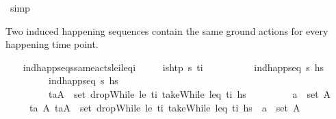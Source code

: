 \begin{isabellebody}
\ simp\isanewline
\ \ \isamarkupfalse%
%
\endisatagproof
{\isafoldproof}%
%
\isadelimproof
%
\endisadelimproof
%
\begin{isamarkuptext}%
Two induced happening sequences contain the same ground actions for 
  every happening time point.%
\end{isamarkuptext}\isamarkuptrue%
\ \ \isamarkupfalse%
\ ind{\isacharunderscore}{\kern0pt}happ{\isacharunderscore}{\kern0pt}seqs{\isacharunderscore}{\kern0pt}same{\isacharunderscore}{\kern0pt}acts{\isacharunderscore}{\kern0pt}le\isactrlsub i{\isacharunderscore}{\kern0pt}leq\isactrlsub i{\isacharcolon}{\kern0pt}\isanewline
\ \ \ \ \ {\isachardoublequoteopen}is{\isacharunderscore}{\kern0pt}htp\ {\isasympi}s\ t\isactrlsub i{\isachardoublequoteclose}\ \isanewline
\ \ \ \ \ \ \ \ \ {\isachardoublequoteopen}ind{\isacharunderscore}{\kern0pt}happ{\isacharunderscore}{\kern0pt}seq\ {\isasympi}s\ hs\ \isanewline
\ \ \ \ \ \ \ \ \ {\isachardoublequoteopen}ind{\isacharunderscore}{\kern0pt}happ{\isacharunderscore}{\kern0pt}seq\ {\isasympi}s\ hs\isanewline
\ \ \ \ \ \ \ \ \ {\isachardoublequoteopen}{\isacharparenleft}{\kern0pt}t\isactrlsub a{\isacharcomma}{\kern0pt}A{\isacharparenright}{\kern0pt}\ {\isasymin}\ set\ {\isacharparenleft}{\kern0pt}dropWhile\ {\isacharparenleft}{\kern0pt}le\ t\isactrlsub i{\isacharparenright}{\kern0pt}\ {\isacharparenleft}{\kern0pt}takeWhile\ {\isacharparenleft}{\kern0pt}leq\ t\isactrlsub i{\isacharparenright}{\kern0pt}\ hs\isanewline
\ \ \ \ \ \ \ \ \ {\isachardoublequoteopen}a\ {\isasymin}\ set\ A{\isachardoublequoteclose}\isanewline
\ \ \ \ \ {\isachardoublequoteopen}{\isasymexists}t\isactrlsub a{\isacharprime}{\kern0pt}\ A{\isacharprime}{\kern0pt}{\isachardot}{\kern0pt}\ {\isacharparenleft}{\kern0pt}t\isactrlsub a{\isacharprime}{\kern0pt}{\isacharcomma}{\kern0pt}A{\isacharprime}{\kern0pt}{\isacharparenright}{\kern0pt}\ {\isasymin}\ set\ {\isacharparenleft}{\kern0pt}dropWhile\ {\isacharparenleft}{\kern0pt}le\ t\isactrlsub i{\isacharparenright}{\kern0pt}\ {\isacharparenleft}{\kern0pt}takeWhile\ {\isacharparenleft}{\kern0pt}leq\ t\isactrlsub i{\isacharparenright}{\kern0pt}\ hs\ {\isasymand}\ a\ {\isasymin}\ set\ A{\isacharprime}{\kern0pt}{\isachardoublequoteclose}\isanewline

\end{isabellebody}
